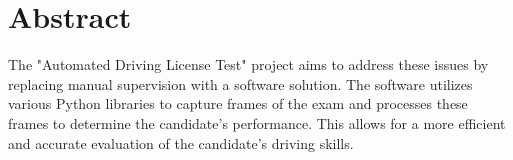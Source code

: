 



\KECcoverpage %
\KECtitlepage %




\chapter*{Abstract} %

The "Automated Driving License Test" project aims to address these issues by replacing manual supervision with a software solution. The software utilizes various Python libraries to capture frames of the exam and processes these frames to determine the candidate's performance. This allows for a more efficient and accurate evaluation of the candidate's driving skills.

